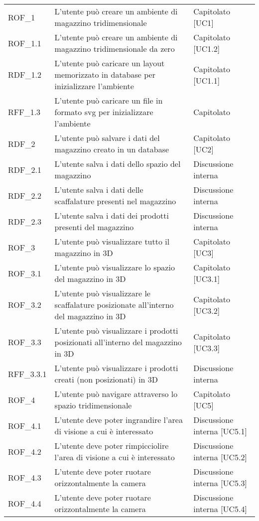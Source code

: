 \begin{xltabular}{\textwidth}{ p{0.2\textwidth} | X | p{0.2\textwidth} }
    ROF\_1& L'utente può creare un ambiente di magazzino tridimensionale & Capitolato [UC1]\\
    ROF\_1.1& L'utente può creare un ambiente di magazzino tridimensionale da zero & Capitolato [UC1.2]\\
    RDF\_1.2& L'utente può caricare un layout memorizzato in database per inizializzare l'ambiente & Capitolato [UC1.1]\\
    RFF\_1.3& L'utente può caricare un file in formato svg per inizializzare l'ambiente & Capitolato \\
    RDF\_2& L'utente può salvare i dati del magazzino creato in un database & Capitolato [UC2]  \\
    RDF\_2.1& L'utente salva i dati dello spazio del magazzino & Discussione interna   \\
    RDF\_2.2& L'utente salva i dati delle scaffalature presenti nel magazzino & Discussione interna   \\
    RDF\_2.3& L'utente salva i dati dei prodotti presenti del magazzino & Discussione interna     \\
    ROF\_3& L'utente può visualizzare tutto il magazzino in 3D & Capitolato [UC3]\\
    ROF\_3.1& L'utente può visualizzare lo spazio del magazzino in 3D & Capitolato [UC3.1]\\
    ROF\_3.2& L'utente può visualizzare le scaffalature posizionate all'interno del magazzino in 3D & Capitolato [UC3.2]\\
    ROF\_3.3& L'utente può visualizzare i prodotti posizionati all'interno del magazzino in 3D & Capitolato [UC3.3]\\
    RFF\_3.3.1& L'utente può visualizzare i prodotti creati (non posizionati) in 3D & Discussione interna       \\
    ROF\_4& L'utente può navigare attraverso lo spazio tridimensionale & Capitolato [UC5]\\
    ROF\_4.1& L'utente deve poter ingrandire l'area di visione a cui è interessato & Discussione interna [UC5.1] \\
    ROF\_4.2& L'utente deve poter rimpicciolire l'area di visione a cui è interessato & Discussione interna [UC5.2] \\
    ROF\_4.3& L'utente deve poter ruotare orizzontalmente la camera & Discussione interna [UC5.3] \\
    ROF\_4.4& L'utente deve poter ruotare orizzontalmente la camera & Discussione interna [UC5.4] \\

\end{xltabular}
